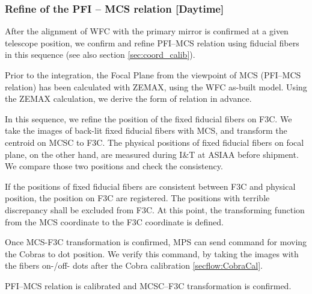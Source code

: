 \subsubsection{Refine of the PFI -- MCS relation [Daytime]}\label{secflow:mcs2f3c}
After the alignment of WFC with the primary mirror is confirmed at a given telescope position, we confirm and refine PFI--MCS relation using fiducial fibers in this sequence (see also section \ref{sec:coord_calib}).

Prior to the integration, the Focal Plane from the viewpoint of MCS (PFI--MCS relation) has been calculated with ZEMAX, using the WFC as-built model.
Using the ZEMAX calculation, we derive the form of relation in advance.

In this sequence, we refine the position of the fixed fiducial fibers on F3C.
We take the images of back-lit fixed fiducial fibers with MCS, and transform the centroid on MCSC to F3C.
The physical positions of fixed fiducial fibers on focal plane, on the other hand, are measured during I\&T at ASIAA before shipment.
We compare those two positions and check the consistency.

If the positions of fixed fiducial fibers are consistent between F3C and physical position, the position on F3C are registered.
The positions with terrible discrepancy shall be excluded from F3C.
At this point, the transforming function from the MCS coordinate to the F3C coordinate is defined.

Once MCS-F3C transformation is confirmed, MPS can send command for moving the Cobras to dot position.
We verify this command, by taking the images with the fibers on-/off- dots after the Cobra calibration \ref{secflow:CobraCal}.

\begin{itembox}[l]{}
PFI--MCS relation is calibrated and MCSC--F3C transformation is confirmed. \\

\end{itembox}